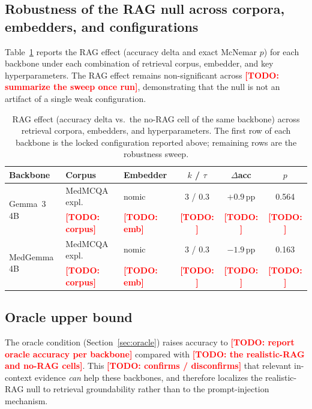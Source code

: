 \documentclass[11pt,a4paper]{article}
\newcommand{\TODO}[1]{\textcolor{red}{\textbf{[TODO: #1]}}}
\begin{document}
\subsection{Robustness of the RAG null across corpora, embedders, and configurations}

Table~\ref{tab:ragrobust} reports the RAG effect (accuracy delta and exact
McNemar $p$) for each backbone under each combination of retrieval corpus,
embedder, and key hyperparameters. The RAG effect remains non-significant across
\TODO{summarize the sweep once run}, demonstrating that the null is not an
artifact of a single weak configuration.

\begin{table}[h]
\centering
\small
\begin{tabular}{lllccc}
\toprule
\textbf{Backbone} & \textbf{Corpus} & \textbf{Embedder} & \textbf{$k$ / $\tau$} & \textbf{$\Delta$acc} & \textbf{$p$} \\
\midrule
\multirow{2}{*}{Gemma~3 4B}  & MedMCQA expl. & nomic & 3 / 0.3 & $+0.9$\,pp & 0.564 \\
                             & \TODO{corpus} & \TODO{emb} & \TODO{} & \TODO{} & \TODO{} \\
\multirow{2}{*}{MedGemma 4B} & MedMCQA expl. & nomic & 3 / 0.3 & $-1.9$\,pp & 0.163 \\
                             & \TODO{corpus} & \TODO{emb} & \TODO{} & \TODO{} & \TODO{} \\
\bottomrule
\end{tabular}
\caption{RAG effect (accuracy delta vs.\ the no-RAG cell of the same backbone)
across retrieval corpora, embedders, and hyperparameters. The first row of each
backbone is the locked configuration reported above; remaining rows are the
robustness sweep.}
\label{tab:ragrobust}
\end{table}

\subsection{Oracle upper bound}

The oracle condition (Section~\ref{sec:oracle}) raises accuracy to \TODO{report
oracle accuracy per backbone} compared with \TODO{the realistic-RAG and no-RAG
cells}. This \TODO{confirms / disconfirms} that relevant in-context evidence
\emph{can} help these backbones, and therefore localizes the realistic-RAG null
to retrieval groundability rather than to the prompt-injection mechanism.
\end{document}
